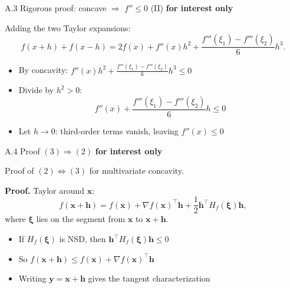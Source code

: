 \documentclass[11pt,aspectratio=169]{beamer}
\newcommand{\InterestOnly}{\textcolor{mAccent}{\textbf{for interest only}}}
\begin{document}
\begin{frame}{A.3 Rigorous proof: concave $\Rightarrow$ $f'' \leq 0$ (II)}
  \small
  \InterestOnly
  
  Adding the two Taylor expansions:
  \[
    f(x+h) + f(x-h) = 2f(x) + f''(x)h^2 + \frac{f'''(\xi_1) - f'''(\xi_2)}{6}h^3.
  \]
  
  \begin{itemize}
    \item By concavity: $f''(x)h^2 + \frac{f'''(\xi_1) - f'''(\xi_2)}{6}h^3 \leq 0$
    
    \item Divide by $h^2 > 0$:
    \[
      f''(x) + \frac{f'''(\xi_1) - f'''(\xi_2)}{6}h \leq 0
    \]
    
    \item Let $h \to 0$: third-order terms vanish, leaving $f''(x) \leq 0$
  \end{itemize}
\end{frame}

\hypertarget{appendix:multivariate_concave}{}
\begin{frame}{A.4 Proof $(3) \Rightarrow (2)$}
  \small
  \InterestOnly
  
  Proof of $(2)\Leftrightarrow(3)$ for multivariate concavity.
  
  \textbf{Proof.} Taylor around $\mathbf{x}$:
  \[
    f(\mathbf{x}+\mathbf{h})
    =
    f(\mathbf{x}) + \nabla f(\mathbf{x})^\top \mathbf{h}
    + \frac{1}{2}\mathbf{h}^\top H_f(\boldsymbol{\xi})\mathbf{h},
  \]
  where $\boldsymbol{\xi}$ lies on the segment from $\mathbf{x}$ to $\mathbf{x}+\mathbf{h}$.
  
  \begin{itemize}
    \item If $H_f(\boldsymbol{\xi})$ is NSD, then $\mathbf{h}^\top H_f(\boldsymbol{\xi})\mathbf{h} \leq 0$
    
    \item So $f(\mathbf{x}+\mathbf{h}) \leq f(\mathbf{x}) + \nabla f(\mathbf{x})^\top \mathbf{h}$
    
    \item Writing $\mathbf{y}=\mathbf{x}+\mathbf{h}$ gives the tangent characterization
  \end{itemize}
\end{frame}
\end{document}
